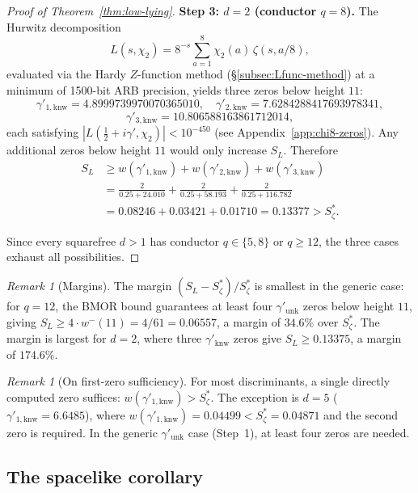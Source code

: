 \documentclass[12pt,reqno]{amsart}
\theoremstyle{plain}
\theoremstyle{definition}
\theoremstyle{remark}
\newtheorem{remark}[theorem]{Remark}
\begin{document}
\begin{proof}[Proof of Theorem~\ref{thm:low-lying}]
\medskip\noindent\textbf{Step 3: $d = 2$ (conductor $q = 8$).}
The Hurwitz decomposition
\[
L(s,\chi_2) = 8^{-s}\sum_{a=1}^8 \chi_2(a)\,\zeta(s,a/8),
\]
evaluated via the Hardy $Z$-function method (\S\ref{subsec:Lfunc-method}) at a minimum of 1500-bit ARB precision, yields three zeros below height $11$:
\[
\gamma'_{1,\mathrm{knw}} = 4.8999739970070365010, \quad
\gamma'_{2,\mathrm{knw}} = 7.6284288417693978341,
\]
\[
\gamma'_{3,\mathrm{knw}} = 10.806588163861712014,
\]
each satisfying $|L(\tfrac{1}{2} + i\gamma', \chi_2)| < 10^{-450}$ (see Appendix~\ref{app:chi8-zeros}).  Any additional zeros below height $11$ would only increase $S_L$.  Therefore
\begin{align*}
  S_L &\geq w(\gamma'_{1,\mathrm{knw}}) + w(\gamma'_{2,\mathrm{knw}}) + w(\gamma'_{3,\mathrm{knw}}) \\
  &= \frac{2}{0.25 + 24.010} + \frac{2}{0.25 + 58.193} + \frac{2}{0.25 + 116.782} \\
  &= 0.08246 + 0.03421 + 0.01710 = 0.13377 > S_\zeta^*.
\end{align*}

Since every squarefree $d > 1$ has conductor $q \in \{5, 8\}$ or $q \geq 12$, the three cases exhaust all possibilities.
\end{proof}

\begin{remark}[Margins]\label{rem:margins}
The margin $(S_L - S_\zeta^*)/S_\zeta^*$ is smallest in the generic case: for $q = 12$, the BMOR bound guarantees at least four $\gamma'_{\mathrm{unk}}$ zeros below height $11$, giving $S_L \geq 4 \cdot w^-(11) = 4/61 = 0.06557$, a margin of $34.6\%$ over $S_\zeta^*$.  The margin is largest for $d = 2$, where three $\gamma'_{\mathrm{knw}}$ zeros give $S_L \geq 0.13375$, a margin of $174.6\%$.
\end{remark}

\begin{remark}[On first-zero sufficiency]\label{rem:first-zero}
For most discriminants, a single directly computed zero suffices: $w(\gamma'_{1,\mathrm{knw}}) > S_\zeta^*$.  The exception is $d = 5$ ($\gamma'_{1,\mathrm{knw}} = 6.6485$), where $w(\gamma'_{1,\mathrm{knw}}) = 0.04499 < S_\zeta^* = 0.04871$ and the second zero is required.  In the generic $\gamma'_{\mathrm{unk}}$ case (Step~1), at least four zeros are needed.
\end{remark}

\subsection{The spacelike corollary}
\end{document}
